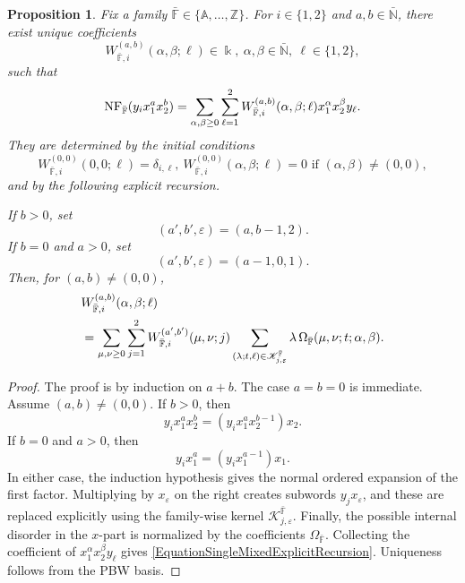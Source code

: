 \documentclass{amsart}
\newtheorem{proposition}[theorem]{Proposition}
\theoremstyle{definition}
\theoremstyle{remark}
\numberwithin{equation}{section}
\begin{document}
\begin{proposition}\label{PropositionSingleMixedExplicit}
Fix a family $\bar{\mathbb{F}}\in\{\mathbb{A},\ldots,\mathbb{Z}\}$. For $i\in\{1,2\}$ and $a,b\in\bar{\mathbb{N}}$, there exist unique coefficients
\[
W_{\bar{\mathbb{F}},i}^{(a,b)}(\alpha,\beta;\ell)\in\Bbbk,
\
\alpha,\beta\in\bar{\mathbb{N}},\ \ell\in\{1,2\},
\]
such that
\begin{equation}\label{EquationSingleMixedExplicitExpansion}
{\rm NF}_{\bar{\mathbb{F}}}(y_ix_1^ax_2^b)
=
\sum_{\alpha,\beta\ge0}
\sum_{\ell=1}^{2}
W_{\bar{\mathbb{F}},i}^{(a,b)}(\alpha,\beta;\ell)
x_1^\alpha x_2^\beta y_\ell.
\end{equation}
They are determined by the initial conditions
\[
W_{\bar{\mathbb{F}},i}^{(0,0)}(0,0;\ell)=\delta_{i,\ell},
\
W_{\bar{\mathbb{F}},i}^{(0,0)}(\alpha,\beta;\ell)=0
\text{ if }(\alpha,\beta)\neq(0,0),
\]
and by the following explicit recursion.

If $b>0$, set
\[
(a',b',\varepsilon)=(a,b-1,2).
\]
If $b=0$ and $a>0$, set
\[
(a',b',\varepsilon)=(a-1,0,1).
\]
Then, for $(a,b)\neq(0,0)$,
\begin{align}
&W_{\bar{\mathbb{F}},i}^{(a,b)}(\alpha,\beta;\ell)
\notag\\
&=
\sum_{\mu,\nu\ge0}
\sum_{j=1}^{2}
W_{\bar{\mathbb{F}},i}^{(a',b')}(\mu,\nu;j)
\sum_{(\lambda;t,\ell)\in\mathscr{K}_{j,\varepsilon}^{\bar{\mathbb{F}}}}
\lambda\,
\Omega_{\bar{\mathbb{F}}}(\mu,\nu;t;\alpha,\beta).
\label{EquationSingleMixedExplicitRecursion}
\end{align}
\end{proposition}

\begin{proof}
The proof is by induction on $a+b$. The case $a=b=0$ is immediate. Assume $(a,b)\neq(0,0)$. If $b>0$, then
\[
y_ix_1^ax_2^b=(y_ix_1^ax_2^{b-1})x_2.
\]
If $b=0$ and $a>0$, then
\[
y_ix_1^a=(y_ix_1^{a-1})x_1.
\]
In either case, the induction hypothesis gives the normal ordered expansion of the first factor. Multiplying by $x_\varepsilon$ on the right creates subwords $y_jx_\varepsilon$, and these are replaced explicitly using the family-wise kernel $\mathscr{K}_{j,\varepsilon}^{\bar{\mathbb{F}}}$. Finally, the possible internal disorder in the $x$-part is normalized by the coefficients $\Omega_{\bar{\mathbb{F}}}$. Collecting the coefficient of $x_1^\alpha x_2^\beta y_\ell$ gives \eqref{EquationSingleMixedExplicitRecursion}. Uniqueness follows from the PBW basis.
\end{proof}
\end{document}

